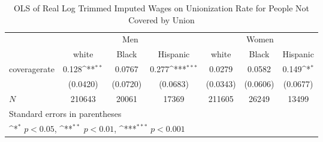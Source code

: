 \begin{table}[htbp]\centering
\def\sym#1{\ifmmode^{#1}\else\(^{#1}\)\fi}
\caption{OLS of Real Log Trimmed Imputed Wages on Unionization Rate for People Not Covered by Union}
\begin{tabular}{l*{6}{c}}
\hline\hline
            &\multicolumn{3}{c}{Men}                                          &\multicolumn{3}{c}{Women}                                        \\\cmidrule(lr){2-4}\cmidrule(lr){5-7}
            &\multicolumn{1}{c}{white}&\multicolumn{1}{c}{Black}&\multicolumn{1}{c}{Hispanic}&\multicolumn{1}{c}{white}&\multicolumn{1}{c}{Black}&\multicolumn{1}{c}{Hispanic}\\
\hline
coveragerate&       0.128\sym{**} &      0.0767         &       0.277\sym{***}&      0.0279         &      0.0582         &       0.149\sym{*}  \\
            &    (0.0420)         &    (0.0720)         &    (0.0683)         &    (0.0343)         &    (0.0606)         &    (0.0677)         \\
\hline
\(N\)       &      210643         &       20061         &       17369         &      211605         &       26249         &       13499         \\
\hline\hline
\multicolumn{7}{l}{\footnotesize Standard errors in parentheses}\\
\multicolumn{7}{l}{\footnotesize \sym{*} \(p<0.05\), \sym{**} \(p<0.01\), \sym{***} \(p<0.001\)}\\
\end{tabular}
\end{table}
